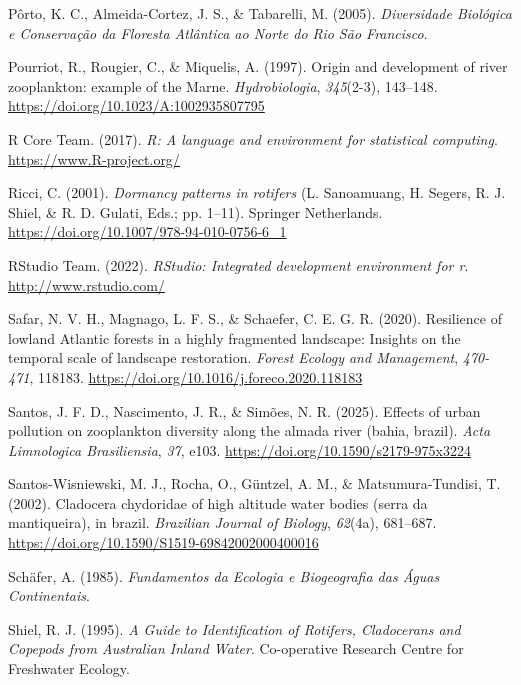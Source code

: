 \documentclass[
  letterpaper,
  DIV=11,
  numbers=noendperiod]{scrartcl}
\newlength{\cslhangindent}
\newenvironment{CSLReferences}[2] %
 {\begin{list}{}{%
  \setlength{\itemindent}{0pt}
  \setlength{\leftmargin}{0pt}
  \setlength{\parsep}{0pt}
  \ifodd #1
   \setlength{\leftmargin}{\cslhangindent}
   \setlength{\itemindent}{-1\cslhangindent}
  \fi
  \setlength{\itemsep}{#2\baselineskip}}}
 {\end{list}}
\begin{document}
\begin{CSLReferences}{1}{0}
Pôrto, K. C., Almeida-Cortez, J. S., \& Tabarelli, M. (2005).
\emph{Diversidade Biológica e Conservação da Floresta Atlântica ao Norte
do Rio São Francisco}.

Pourriot, R., Rougier, C., \& Miquelis, A. (1997). Origin and
development of river zooplankton: example of the Marne.
\emph{Hydrobiologia}, \emph{345}(2-3), 143--148.
\url{https://doi.org/10.1023/A:1002935807795}

R Core Team. (2017). \emph{R: A language and environment for statistical
computing}. \url{https://www.R-project.org/}

Ricci, C. (2001). \emph{Dormancy patterns in rotifers} (L. Sanoamuang,
H. Segers, R. J. Shiel, \& R. D. Gulati, Eds.; pp. 1--11). Springer
Netherlands. \url{https://doi.org/10.1007/978-94-010-0756-6_1}

RStudio Team. (2022). \emph{RStudio: Integrated development environment
for r}. \url{http://www.rstudio.com/}

Safar, N. V. H., Magnago, L. F. S., \& Schaefer, C. E. G. R. (2020).
Resilience of lowland Atlantic forests in a highly fragmented landscape:
Insights on the temporal scale of landscape restoration. \emph{Forest
Ecology and Management}, \emph{470-471}, 118183.
\url{https://doi.org/10.1016/j.foreco.2020.118183}

Santos, J. F. D., Nascimento, J. R., \& Simões, N. R. (2025). Effects of
urban pollution on zooplankton diversity along the almada river (bahia,
brazil). \emph{Acta Limnologica Brasiliensia}, \emph{37}, e103.
\url{https://doi.org/10.1590/s2179-975x3224}

Santos-Wisniewski, M. J., Rocha, O., Güntzel, A. M., \&
Matsumura-Tundisi, T. (2002). Cladocera chydoridae of high altitude
water bodies (serra da mantiqueira), in brazil. \emph{Brazilian Journal
of Biology}, \emph{62}(4a), 681--687.
\url{https://doi.org/10.1590/S1519-69842002000400016}

Schäfer, A. (1985). \emph{Fundamentos da Ecologia e Biogeografia das
Águas Continentais}.

Shiel, R. J. (1995). \emph{A Guide to Identification of Rotifers,
Cladocerans and Copepods from Australian Inland Water}. Co-operative
Research Centre for Freshwater Ecology.


\end{CSLReferences}
\end{document}
